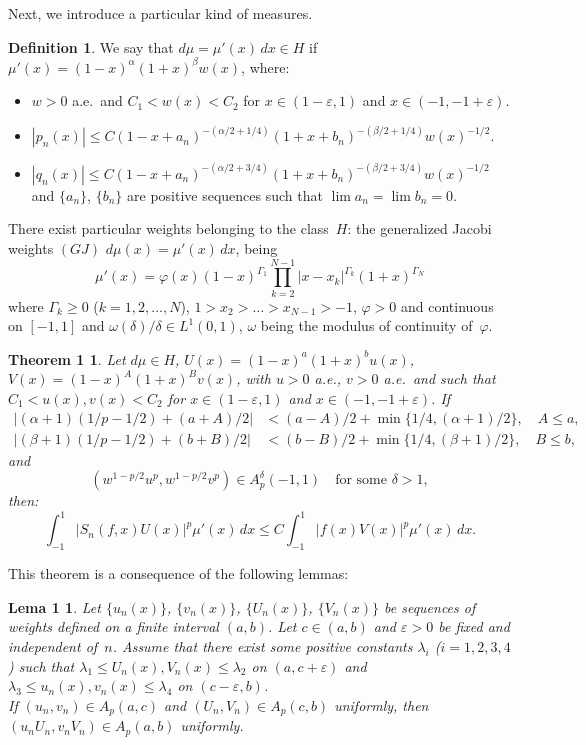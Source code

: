\documentclass[11pt,a4paper]{article}
\theoremstyle{plain}
\newtheorem*{lemOne}{Lema 1}
\newtheorem*{theoOne}{Theorem 1}
\theoremstyle{definition}
\newtheorem*{definition}{Definition}
\theoremstyle{remark}
\begin{document}
Next, we introduce a particular kind of measures.

\begin{definition}
We say that $d\mu = \mu'(x)\,dx \in H$ 
if $\mu'(x) = (1-x)^{\alpha}(1+x)^{\beta}w(x)$, where:
\begin{itemize}
\item[(i)] $w > 0$ a.e.\ and $C_{1} < w(x) < C_{2}$ for $x \in (1-\varepsilon,1)$ 
and $x \in (-1,-1+\varepsilon)$.
\item[(ii)] $|p_{n}(x)| \leq C (1 - x + a_{n})^{-(\alpha/2+1/4)}
(1 + x + b_{n})^{-(\beta/2+1/4)}w(x)^{-1/2}$.
\item[(iii)] $|q_{n}(x)| \leq C (1 - x + a_{n})^{-(\alpha/2+3/4)}
(1 + x + b_{n})^{-(\beta/2+3/4)} w(x)^{-1/2}$
and $\{a_{n}\}$, $\{b_{n}\}$ are positive sequences such that $\lim a_{n} 
= \lim b_{n} = 0$.
\end{itemize}
\end{definition}

There exist particular weights belonging to the class~$H$: the 
generalized Jacobi weights $(GJ)$ $d\mu(x) = \mu'(x)\,dx$, 
being
$$
\mu'(x) = \varphi(x)(1-x)^{\Gamma_{1}}
\prod_{k=2}^{N-1} |x-x_{k}|^{\Gamma_{k}} (1+x)^{\Gamma_{N}}
$$
where $\Gamma_{k} \geq 0$ ($k = 1,2,\dots,N$),
$1 > x_{2} > \dots  > x_{N-1} > -1$, 
$\varphi > 0$ and continuous on $[-1,1]$ and
$\omega(\delta)/\delta \in L^{1}(0,1)$, $\omega$
being the modulus of continuity of~$\varphi$.

\begin{theoOne}
Let $d\mu \in H$, 
$U(x)=(1-x)^{a}(1+x)^{b}u(x)$, 
$V(x)=(1-x)^{A}(1+x)^{B}v(x)$, with 
$u > 0$ a.e., $v > 0$ a.e.\ and such that $C_{1} < u(x), v(x) < C_{2}$ 
for $x \in (1-\varepsilon,1)$ and $x \in (-1,-1+\varepsilon)$. 
If
\begin{align*}
|(\alpha+1)(1/p-1/2) + (a+A)/2| 
&< (a-A)/2 + \min\{1/4,(\alpha+1)/2\},\quad A \leq a,\\
|(\beta+1)(1/p-1/2) + (b+B)/2| 
&< (b-B)/2 + \min\{1/4,(\beta+1)/2\},\quad B \leq b,
\end{align*}
and
$$
  (w^{1-p/2}u^{p},w^{1-p/2}v^{p}) \in A_{p}^{\delta}(-1,1) 
  \quad\text{for some \ } \delta > 1,
$$
then:
$$
\int_{-1}^{1} |S_{n}(f,x)U(x)|^{p}\mu'(x)\,dx 
\leq C\int_{-1}^{1} |f(x)V(x)|^{p}\mu'(x)\,dx.
$$
\end{theoOne}

This theorem is a consequence of the following lemmas:

\begin{lemOne}
Let $\{u_{n}(x)\}$, $\{v_{n}(x)\}$, $\{U_{n}(x)\}$, $\{V_{n}(x)\}$ 
be sequences of weights defined on a finite interval $(a,b)$. Let 
$c \in (a,b)$ and $\varepsilon > 0$ be fixed and independent 
of~$n$. Assume that there exist some positive constants $\lambda_{i}$ 
($i = 1,2,3,4$) such that $\lambda_{1} \leq U_{n}(x), V_{n}(x) 
\leq \lambda_{2}$ on $(a,c+\varepsilon)$ and $\lambda_{3} 
\leq u_{n}(x), v_{n}(x) \leq \lambda_{4}$ on $(c-\varepsilon,b)$.\\
If $(u_{n},v_{n}) \in A_{p}(a,c)$ and $(U_{n},V_{n}) \in A_{p}(c,b)$ 
uniformly, then $(u_{n}U_{n},v_{n}V_{n}) \in A_{p}(a,b)$ 
uniformly.
\end{lemOne}
\end{document}

